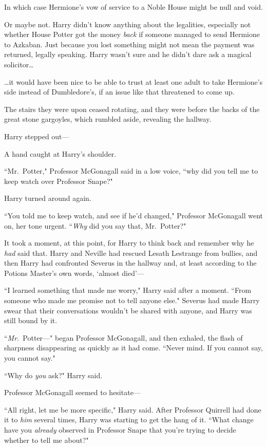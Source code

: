 In which case Hermione's vow of service to a Noble House might be null and void.

Or maybe not. Harry didn't know anything about the legalities, especially not whether House Potter got the money \emph{back} if someone managed to send Hermione to Azkaban. Just because you lost something might not mean the payment was returned, legally speaking. Harry wasn't sure and he didn't dare ask a magical solicitor{\ldots}

{\ldots}it would have been nice to be able to trust at least one adult to take Hermione's side instead of Dumbledore's, if an issue like that threatened to come up.

The stairs they were upon ceased rotating, and they were before the backs of the great stone gargoyles, which rumbled aside, revealing the hallway.

Harry stepped out—

A hand caught at Harry's shoulder.

``Mr.~Potter," Professor McGonagall said in a low voice, ``why did you tell me to keep watch over Professor Snape?"

Harry turned around again.

``You told me to keep watch, and see if he'd changed," Professor McGonagall went on, her tone urgent. ``\emph{Why} did you say that, Mr.~Potter?"

It took a moment, at this point, for Harry to think back and remember why he \emph{had} said that. Harry and Neville had rescued Lesath Lestrange from bullies, and then Harry had confronted Severus in the hallway and, at least according to the Potions Master's own words, `almost died'—

``I learned something that made me worry," Harry said after a moment. ``From someone who made me promise not to tell anyone else." Severus had made Harry swear that their conversations wouldn't be shared with anyone, and Harry was still bound by it.

``\emph{Mr.}~Potter—" began Professor McGonagall, and then exhaled, the flash of sharpness disappearing as quickly as it had come. ``Never mind. If you cannot say, you cannot say."

``Why do \emph{you} ask?" Harry said.

Professor McGonagall seemed to hesitate—

``All right, let me be more specific," Harry said. After Professor Quirrell had done it to \emph{him} several times, Harry was starting to get the hang of it. ``What change have you \emph{already} observed in Professor Snape that you're trying to decide whether to tell me about?"

